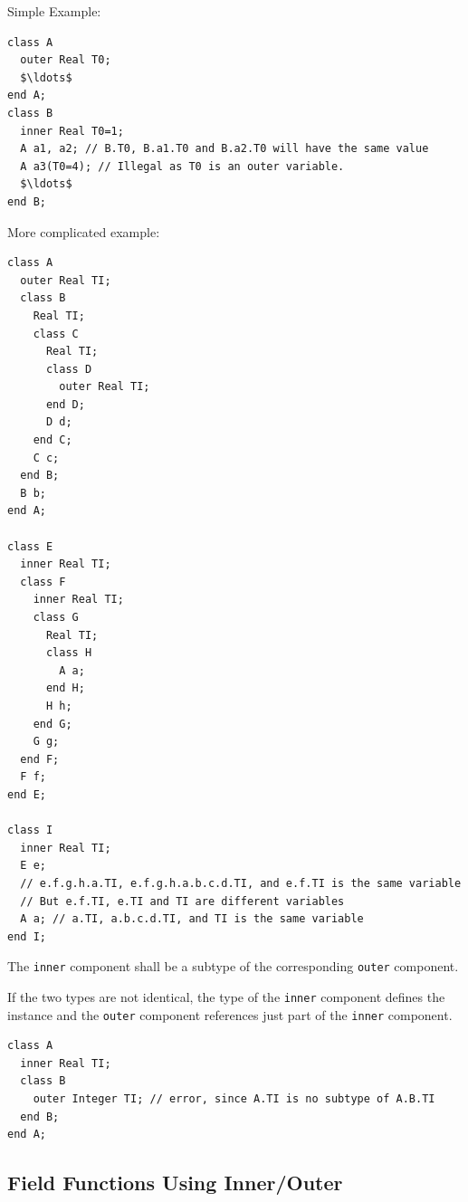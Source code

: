 \begin{example}
Simple Example:
\begin{lstlisting}[language=modelica]
class A
  outer Real T0;
  $\ldots$
end A;
class B
  inner Real T0=1;
  A a1, a2; // B.T0, B.a1.T0 and B.a2.T0 will have the same value
  A a3(T0=4); // Illegal as T0 is an outer variable.
  $\ldots$
end B;
\end{lstlisting}
More complicated example:
\begin{lstlisting}[language=modelica]
class A
  outer Real TI;
  class B
    Real TI;
    class C
      Real TI;
      class D
        outer Real TI;
      end D;
      D d;
    end C;
    C c;
  end B;
  B b;
end A;

class E
  inner Real TI;
  class F
    inner Real TI;
    class G
      Real TI;
      class H
        A a;
      end H;
      H h;
    end G;
    G g;
  end F;
  F f;
end E;

class I
  inner Real TI;
  E e;
  // e.f.g.h.a.TI, e.f.g.h.a.b.c.d.TI, and e.f.TI is the same variable
  // But e.f.TI, e.TI and TI are different variables
  A a; // a.TI, a.b.c.d.TI, and TI is the same variable
end I;
\end{lstlisting}
\end{example}

The \lstinline!inner! component shall be a subtype of the corresponding \lstinline!outer! component.

\begin{nonnormative}
If the two types are not identical, the type of the \lstinline!inner! component defines the instance and the \lstinline!outer! component references just part of the \lstinline!inner! component.
\end{nonnormative}

\begin{example}
\begin{lstlisting}[language=modelica]
class A
  inner Real TI;
  class B
    outer Integer TI; // error, since A.TI is no subtype of A.B.TI
  end B;
end A;
\end{lstlisting}
\end{example}


\subsection{Field Functions Using Inner/Outer}\label{example-of-field-functions-using-inner-outer}\label{field-functions-using-inner-outer}

